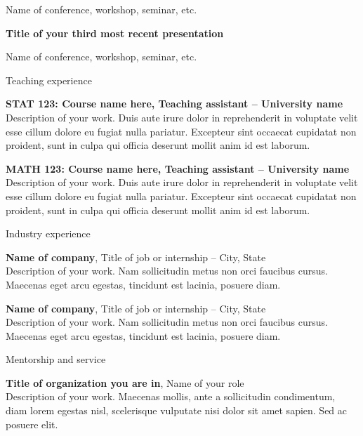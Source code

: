 \documentclass[letterpaper, 10pt]{article}
\newcommand{\heading}[1]{{\large\color{Mahogany} #1}\medskip}
\begin{document}
Name of conference, workshop, seminar, etc. \medskip

\textbf{Title of your third most recent presentation}

Name of conference, workshop, seminar, etc.

\bigskip\bigskip


\heading{Teaching experience}

\textbf{STAT 123: Course name here, Teaching assistant -- University name} \\
Description of your work. Duis aute irure dolor in reprehenderit in voluptate velit esse cillum dolore eu fugiat nulla pariatur. Excepteur sint occaecat cupidatat non proident, sunt in culpa qui officia deserunt mollit anim id est laborum. \medskip

\textbf{MATH 123: Course name here, Teaching assistant -- University name} \\
Description of your work. Duis aute irure dolor in reprehenderit in voluptate velit esse cillum dolore eu fugiat nulla pariatur. Excepteur sint occaecat cupidatat non proident, sunt in culpa qui officia deserunt mollit anim id est laborum.

\bigskip\bigskip


\heading{Industry experience}

\textbf{Name of company}, Title of job or internship -- City, State \\
Description of your work. Nam sollicitudin metus non orci faucibus cursus. Maecenas eget arcu egestas, tincidunt est lacinia, posuere diam. \medskip

\textbf{Name of company}, Title of job or internship -- City, State \\
Description of your work. Nam sollicitudin metus non orci faucibus cursus. Maecenas eget arcu egestas, tincidunt est lacinia, posuere diam.

\bigskip\bigskip


\heading{Mentorship and service}

\textbf{Title of organization you are in}, Name of your role \\
Description of your work. Maecenas mollis, ante a sollicitudin condimentum, diam lorem egestas nisl, scelerisque vulputate nisi dolor sit amet sapien. Sed ac posuere elit. \medskip
\end{document}
